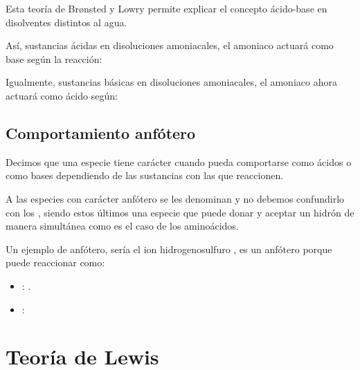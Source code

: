 Esta teoría de Br\o{}nsted y Lowry permite explicar el concepto ácido-base en disolventes distintos al agua.

Así, sustancias ácidas en disoluciones amoniacales, el amoniaco actuará como base según la reacción:
\begin{centeredequation}
\end{centeredequation}

Igualmente, sustancias básicas en disoluciones amoniacales, el amoniaco ahora actuará como ácido según:
\begin{centeredequation}
\end{centeredequation}

\subsection{Comportamiento anfótero}\label{subsec:comportamiento-anfotero}

\begin{center}
    \begin{definition}[Anfótero]
        Decimos que una especie tiene carácter  cuando pueda comportarse como ácidos o como bases dependiendo de las sustancias con las que reaccionen.
    \end{definition}
\end{center}


A las especies con carácter anfótero se les denominan  y no debemos confundirlo con los , siendo estos últimos una especie que puede donar y aceptar un hidrón de manera simultánea como es el caso de los aminoácidos.

Un ejemplo de anfótero, sería el ion hidrogenosulfuro , es un anfótero porque puede reaccionar como:
\begin{itemize}
    \item {}: \hspace{2mm}.
    \item {}: \hspace{2mm}
\end{itemize}


\section{Teoría de Lewis}

